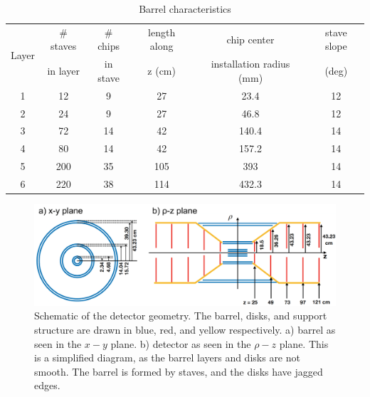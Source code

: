 \documentclass[12pt]{article}
\begin{document}
\begin{table}[H]
\centering
\caption{Barrel characteristics}
\label{tab:barrel}
\begin{tabular}{c|ccccc}
\hline
\multirow{2}{*}{Layer} & \# staves  & \# chips  &length along& chip center                     & stave slope \\
                                   &  in layer    & in stave  &z (cm)        & installation radius (mm) & (deg) \\
\hline \hline
1       			 & 12             & 9            & 27              & 23.4                            & 12                \\
2        			 & 24             & 9            & 27              & 46.8                            & 12                \\
3       			 & 72             & 14          & 42              & 140.4                           & 14                \\
4       			 & 80             & 14          & 42              & 157.2                           & 14                \\
5        			 & 200           & 35          & 105            & 393                             & 14                \\
6        			 & 220           & 38          & 114            & 432.3                           & 14               
\end{tabular}
\end{table}

\begin{figure}
\centering
\includegraphics[width=\textwidth]{figures/geometry_details.jpg}
\caption{Schematic of the detector geometry. The barrel, disks, and support structure are drawn in blue, red, and yellow respectively.
a) barrel as seen in the $x-y$ plane. b) detector as seen in the $\rho-z$ plane.
This is a simplified diagram, as the barrel layers and disks are not smooth. The barrel is formed by staves, and the disks have jagged edges.}
\label{fig:geom}
\end{figure}
\end{document}
